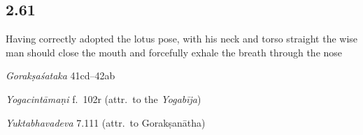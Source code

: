 \begin{ekdosis}

\subsection*{2.61}
\begin{translation}[hp02_061]
Having correctly adopted the lotus pose, with his neck and torso straight the wise man should close the mouth and forcefully exhale the breath through the nose
\end{translation}

\begin{sources}[hp02_061]
\emph{Gorakṣaśataka} 41cd–42ab

\begin{versinnote}
\end{versinnote}
\end{sources}

\begin{testimonia}[hp02_061]
\emph{Yogacintāmaṇi} f.~102r (attr.~to the \emph{Yogabīja})

\begin{versinnote}
\end{versinnote}

\emph{Yuktabhavadeva} 7.111 (attr.~to Gorakṣanātha)

\begin{versinnote}
\end{versinnote}
\end{testimonia}


\end{ekdosis}
